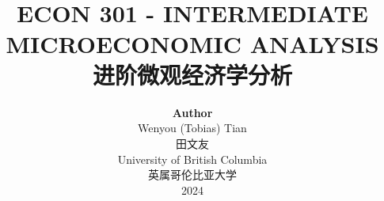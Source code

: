 \title{ \normalsize \textsc{}
		\\ [2.0cm]
		\HRule{1.5pt} \\
		\LARGE \textbf{\uppercase{ECON 301 - Intermediate Microeconomic Analysis}
		\HRule{2.0pt} \\ [0.6cm] \LARGE{进阶微观经济学分析} \vspace*{10\baselineskip}}
		}
\date{}
\author{\textbf{Author} \\ 
		Wenyou (Tobias) Tian \\
        田文友 \\
		University of British Columbia \\
        英属哥伦比亚大学 \\
		2024}

\maketitle
\newpage

\tableofcontents
\newpage
